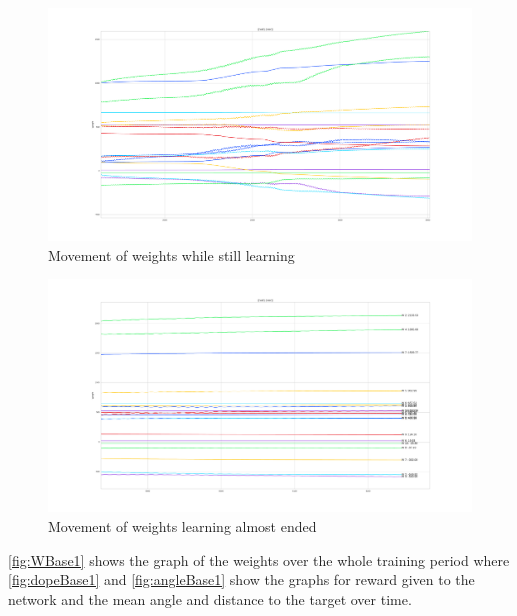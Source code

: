 \begin{figure}[htpb]
  \centering
  \includegraphics[width=\textwidth]{figures/plots/midWBase1}
  \caption{Movement of weights while still learning }
  \label{fig:midWBase1}
\end{figure}


\begin{figure}[htpb]
  \centering
  \includegraphics[width=\textwidth]{figures/plots/endWBase1}
  \caption{Movement of weights learning almost ended }
  \label{fig:endWBase1}
\end{figure}
\autoref{fig:WBase1} shows the graph of the weights over the whole training period where \autoref{fig:dopeBase1} and \autoref{fig:angleBase1} show the graphs for reward given to the network and the mean angle and distance to the target over time.

